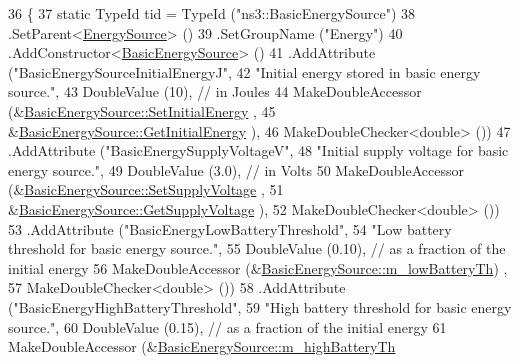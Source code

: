 \begin{DoxyCode}
36 \{
37   \textcolor{keyword}{static} TypeId tid = TypeId (\textcolor{stringliteral}{"ns3::BasicEnergySource"})
38     .SetParent<\hyperlink{classns3_1_1EnergySource_a820794a417c3d2f7909f987ba6064cde}{EnergySource}> ()
39     .SetGroupName (\textcolor{stringliteral}{"Energy"})
40     .AddConstructor<\hyperlink{classns3_1_1BasicEnergySource_a27e2c2df41959fc28689bd99c04687ec}{BasicEnergySource}> ()
41     .AddAttribute (\textcolor{stringliteral}{"BasicEnergySourceInitialEnergyJ"},
42                    \textcolor{stringliteral}{"Initial energy stored in basic energy source."},
43                    DoubleValue (10),  \textcolor{comment}{// in Joules}
44                    MakeDoubleAccessor (&\hyperlink{classns3_1_1BasicEnergySource_ae554fd5c9a66409a364b1d58f20bb4cc}{BasicEnergySource::SetInitialEnergy}
      ,
45                                        &\hyperlink{classns3_1_1BasicEnergySource_a416b12327490de666d341bf0cd4331ce}{BasicEnergySource::GetInitialEnergy}
      ),
46                    MakeDoubleChecker<double> ())
47     .AddAttribute (\textcolor{stringliteral}{"BasicEnergySupplyVoltageV"},
48                    \textcolor{stringliteral}{"Initial supply voltage for basic energy source."},
49                    DoubleValue (3.0), \textcolor{comment}{// in Volts}
50                    MakeDoubleAccessor (&\hyperlink{classns3_1_1BasicEnergySource_a9271fd41ec952e117e76ba6cc130046d}{BasicEnergySource::SetSupplyVoltage}
      ,
51                                        &\hyperlink{classns3_1_1BasicEnergySource_a19f4054a9ae5f63216067b9ff7132ae6}{BasicEnergySource::GetSupplyVoltage}
      ),
52                    MakeDoubleChecker<double> ())
53     .AddAttribute (\textcolor{stringliteral}{"BasicEnergyLowBatteryThreshold"},
54                    \textcolor{stringliteral}{"Low battery threshold for basic energy source."},
55                    DoubleValue (0.10), \textcolor{comment}{// as a fraction of the initial energy}
56                    MakeDoubleAccessor (&\hyperlink{classns3_1_1BasicEnergySource_a69b07f157ebfc2d44aab53ebacf6fc95}{BasicEnergySource::m\_lowBatteryTh})
      ,
57                    MakeDoubleChecker<double> ())
58     .AddAttribute (\textcolor{stringliteral}{"BasicEnergyHighBatteryThreshold"},
59                    \textcolor{stringliteral}{"High battery threshold for basic energy source."},
60                    DoubleValue (0.15), \textcolor{comment}{// as a fraction of the initial energy}
61                    MakeDoubleAccessor (&\hyperlink{classns3_1_1BasicEnergySource_ad4fe0a077e4695ea2b5ca1aa82b7e0be}{BasicEnergySource::m\_highBatteryTh}

\end{DoxyCode}
